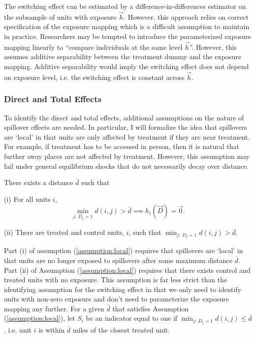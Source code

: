 \documentclass[11pt]{article}
\begin{document}
The switching effect can be estimated by a difference-in-differences estimator on the subsample of units with exposure $\vec{h}$. However, this approach relies on correct specification of the exposure mapping which is a difficult assumption to maintain in practice. Researchers may be tempted to introduce the parameterized exposure mapping linearly to ``compare individuals at the same level $\vec{h}$''. However, this assumes additive separability between the treatment dummy and the exposure mapping. Additive separability would imply the switching effect does not depend on exposure level, i.e. the switching effect is constant across $\vec{h}$.

\subsubsection{Direct and Total Effects}

To identify the direct and total effects, additional assumptions on the nature of spillover effects are needed. In particular, I will formalize the idea that spillovers are `local' in that units are only affected by treatment if they are near treatment. For example, if treatment has to be accessed in person, then it is natural that further away places are not affected by treatment. However, this assumption may fail under general equilibrium shocks that do not necessarily decay over distance.

\begin{assumption}\label{assumption:local}
    There exists a distance $\bar{d}$ such that 
    
    (i) For all units $i$,
    \[ 
        \min_{j: \ D_j = 1} d(i,j) > \bar{d} \implies h_i(\vec{D}) = \vec{0}. 
    \]

    (ii) There are treated and control units, $i$, such that $\min_{j: \ D_j = 1} d(i,j) > \bar{d}$.
\end{assumption}

Part (i) of assumption (\ref{assumption:local}) requires that spillovers are `local' in that units are no longer exposed to spillovers after some maximum distance $\bar{d}$. Part (ii) of Assumption (\ref{assumption:local}) requires that there exists control and treated units with no exposure. This assumption is far less strict than the identifying assumption for the switching effect in that we only need to identify units with non-zero exposure and don't need to parameterize the exposure mapping any further. For a given $\bar{d}$ that satisfies Assumption (\ref{assumption:local}), let $S_{i}$ be an indicator equal to one if $\min_{j: \ D_j = 1} d(i,j) \leq \bar{d}$, i.e. unit $i$ is within $\bar{d}$ miles of the closest treated unit.
\end{document}
